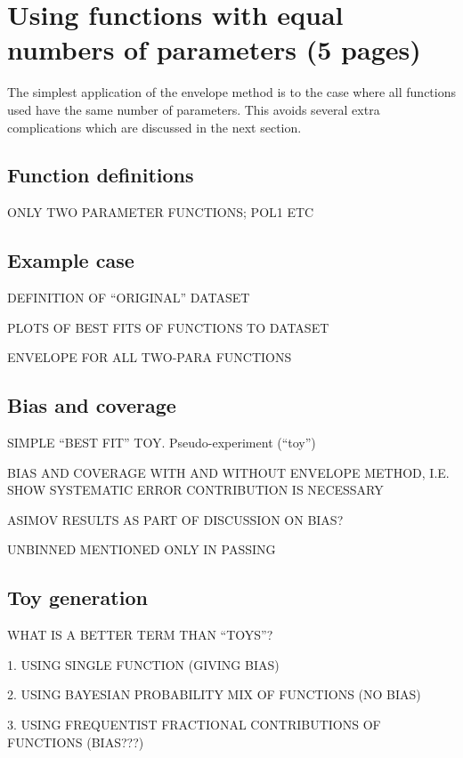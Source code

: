 \section{Using functions with equal numbers of parameters (5 pages)}
\label{sec:functions}

The simplest application of the envelope method is to the case where all
functions used have the same number of parameters. This avoids several extra
complications which are discussed in the next section.

\subsection{Function definitions}
\label{sec:functions:function}

ONLY TWO PARAMETER FUNCTIONS; POL1 ETC

\subsection{Example case}
\label{sec:functions:example}
DEFINITION OF ``ORIGINAL'' DATASET

PLOTS OF BEST FITS OF FUNCTIONS TO DATASET

ENVELOPE FOR ALL TWO-PARA FUNCTIONS


\subsection{Bias and coverage}
\label{sec:functions:coverage}
SIMPLE ``BEST FIT'' TOY.
Pseudo-experiment (``toy'')

BIAS AND COVERAGE WITH AND WITHOUT ENVELOPE METHOD, I.E. SHOW SYSTEMATIC
ERROR CONTRIBUTION IS NECESSARY

ASIMOV RESULTS AS PART OF DISCUSSION ON BIAS?

UNBINNED MENTIONED ONLY IN PASSING


\subsection{Toy generation}
\label{sec:functions:toys}

WHAT IS A BETTER TERM THAN ``TOYS''?

1. USING SINGLE FUNCTION (GIVING BIAS)

2. USING BAYESIAN PROBABILITY MIX OF FUNCTIONS (NO BIAS)

3. USING FREQUENTIST FRACTIONAL CONTRIBUTIONS OF FUNCTIONS (BIAS???)
